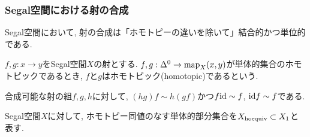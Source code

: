\documentclass[aspectratio=169, dvipdfmx, 8pt, notheorems, uplatex]{beamer}
\begin{document}
\begin{frame}
  \frametitle{Segal空間における射の合成}

  Segal空間において, 射の合成は「ホモトピーの違いを除いて」結合的かつ単位的である. 

  \begin{definition}[ホモトピック]
    $f, g : x \to y$をSegal空間$X$の射とする. 
    $f,g : \Delta^0 \to \mathrm{map}_X(x,y)$が単体的集合のホモトピックであるとき, $f$と$g$はホモトピック(homotopic)であるという. 
  \end{definition}

  \begin{theorem}
    合成可能な射の組$f,g,h$に対して, $(hg)f \sim h(gf)$かつ$f\mathrm{id} \sim f$, $\mathrm{id} f \sim f$である. 
  \end{theorem}

  \begin{definition}[ホモトピー同値の空間]
    Segal空間$X$に対して, ホモトピー同値のなす単体的部分集合を$X_{\mathrm{hoequiv}} \subset X_1$と表す. 
  \end{definition}

  

\end{frame}
\end{document}
